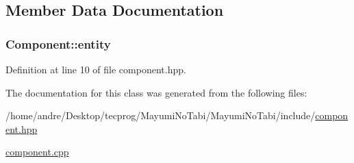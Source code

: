 \subsection{Member Data Documentation}
\hypertarget{class_component_a98c878b6e50bd78de3882e44bf3332e0}{
\subsubsection[{entity}]{ Component\-::entity}}\label{class_component_a98c878b6e50bd78de3882e44bf3332e0}


Definition at line 10 of file component.\-hpp.



The documentation for this class was generated from the following files\-:\begin{DoxyCompactItemize}
\item 
/home/andre/\-Desktop/tecprog/\-Mayumi\-No\-Tabi/\-Mayumi\-No\-Tabi/include/\hyperlink{component_8hpp}{component.\-hpp}\item 
\hyperlink{component_8cpp}{component.\-cpp}\end{DoxyCompactItemize}
